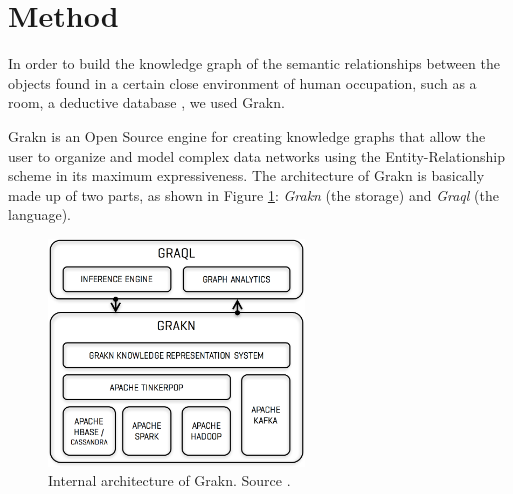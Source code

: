 \section{Method}
\label{sec:metodo}

In order to build the knowledge graph of the semantic relationships between 
the objects found in a certain close environment of human occupation, such as 
a room, a deductive database \cite{stichbury}, we used Grakn.

Grakn is an Open Source engine for creating knowledge graphs that allow the 
user to organize and model complex data networks using the Entity-Relationship 
scheme in its maximum expressiveness. The architecture of Grakn is basically 
made up of two parts, as shown in Figure \ref{fig:arch}: \textit{Grakn} 
(the storage) and \textit{Graql} (the language).

\begin{figure}[H]
    \centering
    \includegraphics[width=6.8cm]{figures/architecture}
    \caption{Internal architecture of Grakn.
    Source \cite{stichbury}.}
    \label{fig:arch}
\end{figure}

